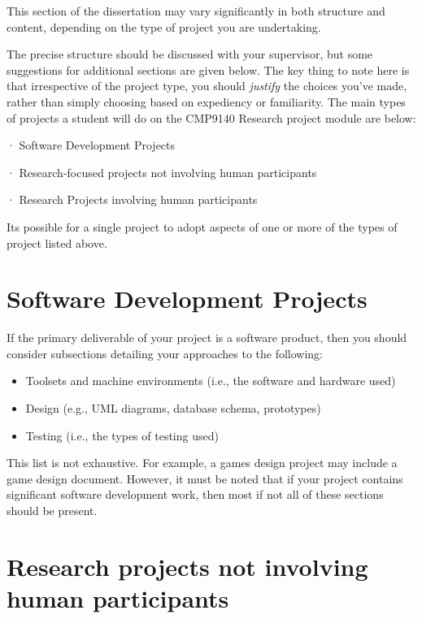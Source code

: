 This section of the dissertation may vary significantly in both structure and content, depending on the type of project you are undertaking. 

The precise structure should be discussed with your supervisor, but some suggestions for additional sections are given below. The key thing to note here is that irrespective of the project type, you should \textit{justify} the choices you've made, rather than simply choosing based on expediency or familiarity. The main types of projects a student will do on the CMP9140 Research project module are below:

· Software Development Projects

· Research-focused projects not involving human participants

· Research Projects involving human participants

Its possible for a single project to adopt aspects of one or more of the types of project listed above.

\section{Software Development Projects}

If the primary deliverable of your project is a software product, then you should consider subsections detailing your approaches to the following:
\begin{itemize}
    \item Toolsets and machine environments (i.e., the software and hardware used)
    \item Design (e.g., UML diagrams, database schema, prototypes)
    \item Testing (i.e., the types of testing used)
\end{itemize}
This list is not exhaustive. For example, a games design project may include a game design document. However, it must be noted that if your project contains significant software development work, then most if not all of these sections should be present.

\section{Research projects not involving human participants}

